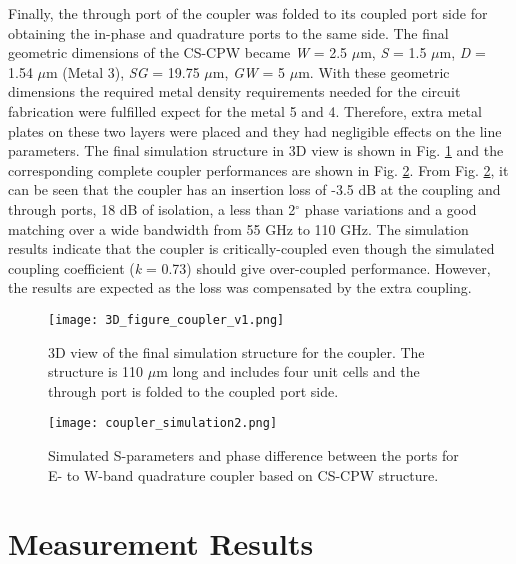 \documentclass[journal]{IEEEtran}
\begin{document}
Finally, the through port of the coupler was folded to its coupled port side for obtaining the in-phase and quadrature ports to the same side. The final geometric dimensions of the CS-CPW became \textit{W} = 2.5 $\mu$m, \textit{S} = 1.5 $\mu$m, \textit{D} = 1.54 $\mu$m (Metal 3), \textit{SG} = 19.75 $\mu$m, \textit{GW} = 5 $\mu$m. With these geometric dimensions the required metal density requirements needed for the circuit fabrication were fulfilled expect for the metal 5 and 4. Therefore, extra metal plates on these two layers were placed and they had negligible effects on the line parameters. The final simulation structure in 3D view is shown in Fig. \ref{3D_full} and the corresponding complete coupler performances are shown in Fig. \ref{simulated_results}. From Fig. \ref{simulated_results}, it can be seen that the coupler has an insertion loss of -3.5 dB at the coupling and through ports, 18 dB of isolation, a less than 2$^\circ$ phase variations and a good matching over a wide bandwidth from 55 GHz to 110 GHz. The simulation results indicate that the coupler is critically-coupled even though the simulated coupling coefficient (\textit{k} = 0.73) should give over-coupled performance. However, the results are expected as the loss was compensated by the extra coupling.  

\begin{figure}
	\texttt{[image: 3D\_figure\_coupler\_v1.png]}
	\caption{3D view of the final simulation structure for the coupler. The structure is 110 $\mu$m long and includes four unit cells and the through port is folded to the coupled port side.}
	\label{3D_full}
\end{figure}

\begin{figure}
	\texttt{[image: coupler\_simulation2.png]}
	\caption{Simulated S-parameters and phase difference between the ports for E- to W-band quadrature coupler based on CS-CPW structure.}
	\label{simulated_results}
\end{figure}

\section{Measurement Results}
\end{document}
